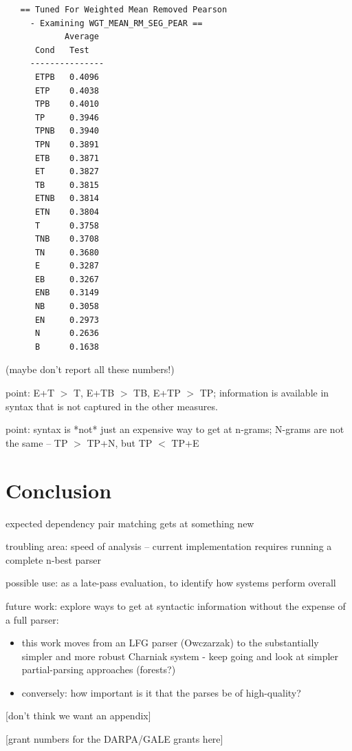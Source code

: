 \documentclass{kluwer}    %
\begin{document}
\begin{article}
\begin{verbatim}
   == Tuned For Weighted Mean Removed Pearson
     - Examining WGT_MEAN_RM_SEG_PEAR ==
            Average
      Cond   Test  
     ---------------
      ETPB   0.4096
      ETP    0.4038
      TPB    0.4010
      TP     0.3946
      TPNB   0.3940
      TPN    0.3891
      ETB    0.3871
      ET     0.3827
      TB     0.3815
      ETNB   0.3814
      ETN    0.3804
      T      0.3758
      TNB    0.3708
      TN     0.3680
      E      0.3287
      EB     0.3267
      ENB    0.3149
      NB     0.3058
      EN     0.2973
      N      0.2636
      B      0.1638
\end{verbatim}
(maybe don't report all these numbers!)
  
point: E+T $>$ T, E+TB $>$ TB, E+TP $>$ TP; information is available in
syntax that is not captured in the other measures.

point: syntax is *not* just an expensive way to get at n-grams;
N-grams are not the same -- TP $>$ TP+N, but TP $<$ TP+E

\section{Conclusion}
\label{sec:conclusion}
expected dependency pair matching gets at something new

troubling area: speed of analysis -- current implementation requires
running a complete n-best parser

possible use: as a late-pass evaluation, to identify how systems
perform overall

future work:  explore ways to get at syntactic information without
the expense of a full parser:
\begin{itemize}
\item this work moves from an LFG parser (Owczarzak) to the
  substantially simpler and more robust Charniak system - keep going
  and look at simpler partial-parsing approaches (forests?)
\item conversely: how important is it that the parses be of
  high-quality?
\end{itemize}





\appendix

[don't think we want an appendix]


\acknowledgements

[grant numbers for the DARPA/GALE grants here]






\end{article}
\end{document}
